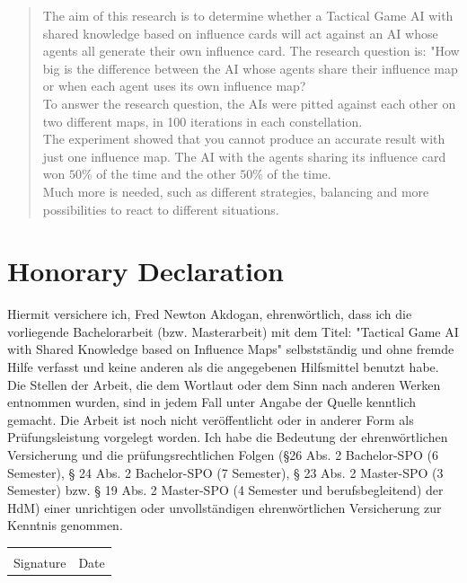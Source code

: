 \documentclass[]{report}
\begin{document}
\renewcommand\abstractname{Abstract}            %

\begin{abstract}
	The aim of this research is to determine whether a Tactical Game AI with shared knowledge based on influence cards will act against an AI whose agents all generate their own influence card. The research question is: "How big is the difference between the AI whose agents share their influence map or when each agent uses its own influence map? \\
	
	To answer the research question, the AIs were pitted against each other on two different maps, in 100 iterations in each constellation. \\
	
	The experiment showed that you cannot produce an accurate result with just one influence map. The AI with the agents sharing its influence card won $50\%$ of the time and the other $50\%$ of the time. \\
	
	Much more is needed, such as different strategies, balancing and more possibilities to react to different situations. 
\end{abstract}
	
	\newpage
	\chapter*{Honorary Declaration}
	\thispagestyle{empty}
	Hiermit versichere ich, Fred Newton Akdogan, ehrenwörtlich, dass ich die
	vorliegende Bachelorarbeit (bzw. Masterarbeit) mit dem Titel: "Tactical Game AI with Shared Knowledge based on Influence Maps" selbstständig und ohne fremde Hilfe verfasst und keine
	anderen als die angegebenen Hilfsmittel benutzt habe. Die Stellen der Arbeit, die dem
	Wortlaut oder dem Sinn nach anderen Werken entnommen wurden, sind in jedem Fall
	unter Angabe der Quelle kenntlich gemacht. Die Arbeit ist noch nicht veröffentlicht oder
	in anderer Form als Prüfungsleistung vorgelegt worden.
	Ich habe die Bedeutung der ehrenwörtlichen Versicherung und die prüfungsrechtlichen
	Folgen (§26 Abs. 2 Bachelor-SPO (6 Semester), § 24 Abs. 2 Bachelor-SPO (7 Semester), §
	23 Abs. 2 Master-SPO (3 Semester) bzw. § 19 Abs. 2 Master-SPO (4 Semester und
	berufsbegleitend) der HdM) einer unrichtigen oder unvollständigen ehrenwörtlichen
	Versicherung zur Kenntnis genommen.
	
	\vfill
	\noindent\begin{tabular}{ll}
		\makebox[2.5in]{\hrulefill} & \makebox[2.5in]{\hrulefill}\\
		Signature & Date\\[8ex]
	\end{tabular}
	\newpage
	
\end{document}

